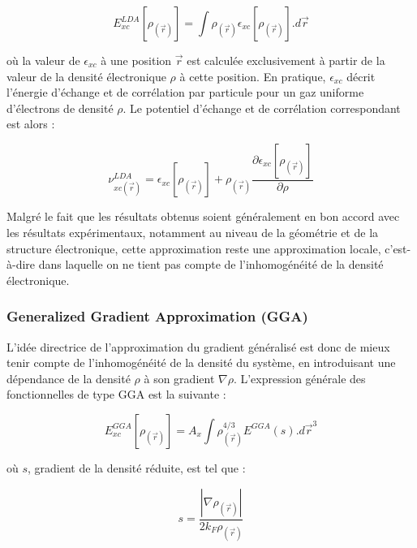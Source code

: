 	\begin{equation}
	E_{xc}^{LDA}[\rho_{(\vec{r})}] = \int \rho_{(\vec{r})} \epsilon_{xc}[\rho_{(\vec{r})}].d\vec{r}
	\end{equation}
	
	\noindent où la valeur de $\epsilon_{xc}$ à une position $\vec{r}$ est calculée exclusivement à partir de la valeur de la densité électronique $\rho$ à cette position. En pratique, $\epsilon_{xc}$ décrit l’énergie d’échange et de corrélation par particule pour un gaz uniforme d’électrons de densité $\rho$. Le potentiel d’échange et de corrélation correspondant est alors :
	
	\begin{equation}
	\nu_{xc(\vec{r})}^{LDA} = \epsilon_{xc}[\rho_{(\vec{r})}] + \rho_{(\vec{r})} \frac{\partial \epsilon_{xc}[\rho_{(\vec{r})}]}{\partial \rho}
	\end{equation}
	
	Malgré le fait que les résultats obtenus soient généralement en bon accord avec les résultats expérimentaux, notamment au niveau de la géométrie et de la structure électronique, cette approximation reste une approximation locale, c'est-à-dire dans laquelle on ne tient pas compte de l’inhomogénéité de la densité électronique.
	
	\subsubsection{Generalized Gradient Approximation (GGA)}
	
	L’idée directrice de l’approximation du gradient généralisé est donc de mieux tenir compte de l’inhomogénéité de la densité du système, en introduisant une dépendance de la densité $\rho$ à son gradient $\nabla \rho$. L’expression générale des fonctionnelles de type GGA est la
	suivante :
	
	\begin{equation}
	E_{xc}^{GGA}[\rho_{(\vec{r})}] = A_{x} \int \rho_{(\vec{r})}^{4/3} E^{GGA}(s) .d\vec{r}^{3}
	\end{equation}
	
	\noindent où $s$, gradient de la densité réduite, est tel que :
	
	\begin{equation}
	s = \frac{|\nabla \rho_{(\vec{r})}|}{2 k_{F} \rho_{(\vec{r})}}
	\end{equation}
	
